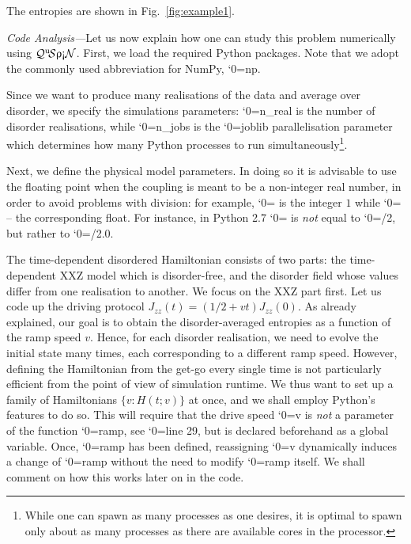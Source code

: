 \documentclass{SciPost}
\newcommand\0{\scalebox{-1}[1]{0}}
\let\svttfamily\ttfamily
\renewcommand\ttfamily{\svttfamily\catcode`0=\active }
\renewcommand\texttt{\bgroup\ttfamily\texttthelp}
\def\texttthelp#1{#1\egroup}
\newcommand{\qspin}{$\mathcal{Q}^{\mathrm{u}}\!\mathcal{S}\uprho\mathrm{\text{\textexclamdown}}\mathcal{N}$}
\begin{document}
The entropies are shown in Fig.~\ref{fig:example1}.


\emph{Code Analysis---}Let us now explain how one can study this problem numerically using \qspin. First, we load the required Python packages. Note that we adopt the commonly used abbreviation for NumPy, \texttt{np}. 

%
Since we want to produce many realisations of the data and average over disorder, we specify the simulations parameters: \texttt{n\_real} is the number of disorder realisations, while \texttt{n\_jobs} is the \texttt{joblib} parallelisation parameter which determines how many Python processes to run simultaneously\footnote{While one can spawn as many processes as one desires, it is optimal to spawn only about as many processes as there are available cores in the processor.}.

%
Next, we define the physical model parameters. In doing so it is advisable to use the floating point when the coupling is meant to be a non-integer real number, in order to avoid problems with division: for example, \texttt{1} is the integer $1$ while \texttt{1.0} -- the corresponding float. For instance, in Python 2.7 \texttt{0.5} is \emph{not} equal to \texttt{1/2}, but rather to \texttt{1.0/2.0}.  

%
The time-dependent disordered Hamiltonian consists of two parts: the time-dependent XXZ model which is disorder-free, and the disorder field whose values differ from one realisation to another. We focus on the XXZ part first. Let us code up the driving protocol $J_{zz}(t) = (1/2 + vt)J_{zz}(0)$. As already explained, our goal is to obtain the disorder-averaged entropies as a function of the ramp speed $v$. Hence, for each disorder realisation, we need to evolve the initial state many times, each corresponding to a different ramp speed. However, defining the Hamiltonian from the get-go every single time is not particularly efficient from the point of view of simulation runtime. We thus want to set up a family of Hamiltonians $\{v:H(t;v)\}$ at once, and we shall employ Python's features to do so. This will require that the drive speed \texttt{v} is \emph{not} a parameter of the function \texttt{ramp}, see \texttt{line 29}, but is declared beforehand as a global variable. Once, \texttt{ramp} has been defined, reassigning \texttt{v} dynamically induces a change of \texttt{ramp} without the need to modify \texttt{ramp} itself. We shall comment on how this works later on in the code.   
\end{document}
